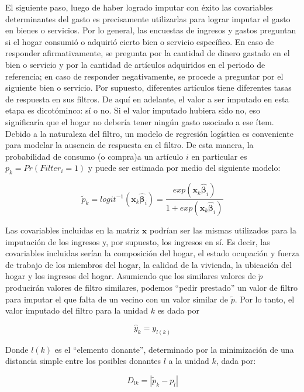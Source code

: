 \documentclass[
  12pt,
  spanish,
]{book}
\begin{document}
El siguiente paso, luego de haber logrado imputar con éxito las covariables determinantes del gasto es precisamente utilizarlas para lograr imputar el gasto en bienes o servicios. Por lo general, las encuestas de ingresos y gastos preguntan si el hogar consumió o adquirió cierto bien o servicio específico. En caso de responder afirmativamente, se pregunta por la cantidad de dinero gastado en el bien o servicio y por la cantidad de artículos adquiridos en el periodo de referencia; en caso de responder negativamente, se procede a preguntar por el siguiente bien o servicio. Por supuesto, diferentes artículos tiene diferentes tasas de respuesta en sus filtros. De aquí en adelante, el valor a ser imputado en esta etapa es dicotóminco: sí o no. Si el valor imputado hubiera sido no, eso significaría que el hogar no debería tener ningún gasto asociado a ese ítem. Debido a la naturaleza del filtro, un modelo de regresión logística es conveniente para modelar la ausencia de respuesta en el filtro. De esta manera, la probabilidad de consumo (o compra)a un artículo \(i\) en particular es \(p_k = Pr(Filter_i = 1)\) y puede ser estimada por medio del siguiente modelo:

\[
\tilde{p}_k = logit^{-1}(\mathbf{x}_k \hat{\boldsymbol{\beta}}_i) =
\frac{exp(\mathbf{x}_k \hat{\boldsymbol{\beta}}_i)}{1+exp(\mathbf{x}_k \hat{\boldsymbol{\beta}}_i)}
\]

Las covariables incluidas en la matriz \(\mathbf{x}\) podrían ser las mismas utilizados para la imputación de los ingresos y, por supuesto, los ingresos en sí. Es decir, las covariables incluidas serían la composición del hogar, el estado ocupación y fuerza de trabajo de los miembros del hogar, la calidad de la vivienda, la ubicación del hogar y los ingresos del hogar. Asumiendo que los similares valores de \(\tilde p\) producirán valores de filtro similares, podemos ``pedir prestado'' un valor de filtro para imputar el que falta de un vecino con un valor similar de \(\tilde p\). Por lo tanto, el valor imputado del filtro para la unidad \(k\) es dada por

\[\hat{y}_k = y_{l(k)}\]

Donde \(l(k)\) es el ``elemento donante'', determinado por la minimización de una distancia simple entre los posibles donantes \(l\) a la unidad \(k\), dada por:

\[
D_{lk} = |\tilde p_k - p_l|
\]
\end{document}
